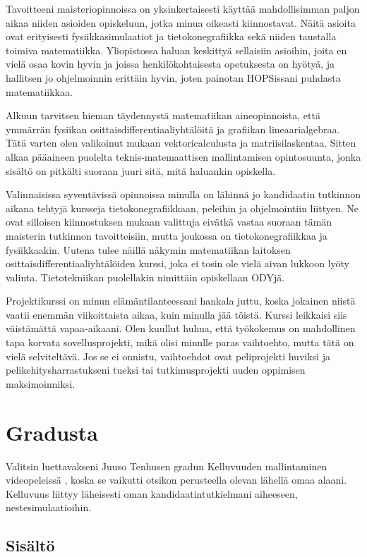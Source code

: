 \documentclass[utf8]{gradu3}
\begin{document}
Tavoitteeni maisteriopinnoissa on yksinkertaisesti käyttää mahdollisimman paljon
aikaa niiden asioiden opiskeluun, jotka minua oikeasti kiinnostavat. Näitä
asioita ovat erityisesti fysiikkasimulaatiot ja tietokonegrafiikka sekä niiden
taustalla toimiva matematiikka. Yliopistossa haluan keskittyä sellaisiin
asioihin, joita en vielä osaa kovin hyvin ja joissa henkilökohtaisesta
opetuksesta on hyötyä, ja hallitsen jo ohjelmoinnin erittäin hyvin, joten
painotan HOPSissani puhdasta matematiikkaa.

Alkuun tarvitsen hieman täydennystä matematiikan aineopinnoista, että ymmärrän
fysiikan osittaisdifferentiaaliyhtälöitä ja grafiikan lineaarialgebraa. Tätä
varten olen valikoinut mukaan vektoricalculusta ja matriisilaskentaa. Sitten
alkaa pääaineen puolelta teknis-matemaattisen mallintamisen opintosuunta, jonka
sisältö on pitkälti suoraan juuri sitä, mitä haluankin opiskella.

Valinnaisissa syventävissä opinnoissa minulla on lähinnä jo kandidaatin
tutkinnon aikana tehtyjä kursseja tietokonegrafiikkaan, peleihin ja
ohjelmointiin liittyen. Ne ovat silloisen kiinnostuksen mukaan valittuja eivätkä
vastaa suoraan tämän maisterin tutkinnon tavoitteisiin, mutta joukossa on
tietokonegrafiikkaa ja fysiikkaakin. Uutena tulee näillä näkymin matematiikan
laitoksen osittaisdifferentiaaliyhtälöiden kurssi, joka ei tosin ole vielä aivan
lukkoon lyöty valinta. Tietotekniikan puolellakin nimittäin opiskellaan ODYjä.

Projektikurssi on minun elämäntilanteessani hankala juttu, koska jokainen niistä
vaatii enemmän viikoittaista aikaa, kuin minulla jää töistä. Kurssi leikkaisi
siis väistämättä vapaa-aikaani. Olen kuullut huhua, että työkokemus on
mahdollinen tapa korvata sovellusprojekti, mikä olisi minulle paras vaihtoehto,
mutta tätä on vielä selviteltävä. Jos se ei onnistu, vaihtoehdot ovat
peliprojekti huviksi ja pelikehitysharrastukseni tueksi tai tutkimusprojekti
uuden oppimisen maksimoinniksi.

\section{Gradusta}

Valitsin luettavakseni Juuso Tenhusen gradun Kelluvuuden mallintaminen
videopeleissä \parencite*{Tenhunen2020buoyancy}, koska se vaikutti otsikon
perusteella olevan lähellä omaa alaani. Kelluvuus liittyy läheisesti oman
kandidaatintutkielmani aiheeseen, nestesimulaatioihin.

\subsection{Sisältö}
\end{document}
